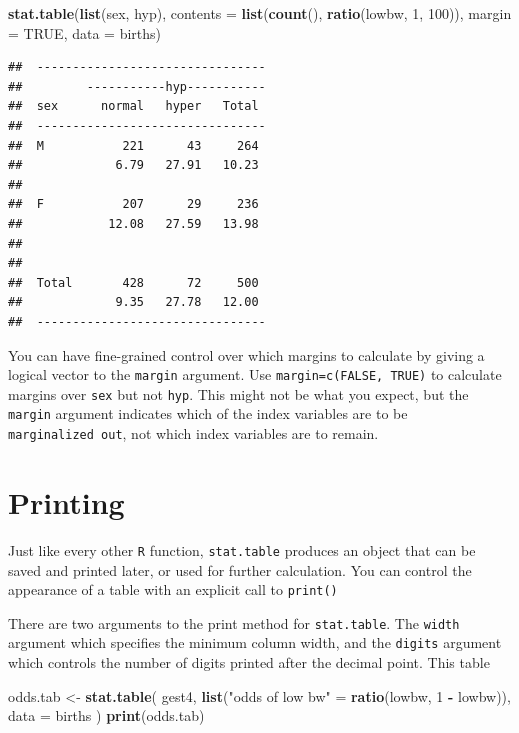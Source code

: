 \documentclass[
]{book}
\newenvironment{Shaded}{\begin{snugshade}}{\end{snugshade}}
\newcommand{\AttributeTok}[1]{\textcolor[rgb]{0.13,0.29,0.53}{#1}}
\newcommand{\ConstantTok}[1]{\textcolor[rgb]{0.56,0.35,0.01}{#1}}
\newcommand{\DecValTok}[1]{\textcolor[rgb]{0.00,0.00,0.81}{#1}}
\newcommand{\FunctionTok}[1]{\textcolor[rgb]{0.13,0.29,0.53}{\textbf{#1}}}
\newcommand{\NormalTok}[1]{#1}
\newcommand{\OtherTok}[1]{\textcolor[rgb]{0.56,0.35,0.01}{#1}}
\newcommand{\SpecialCharTok}[1]{\textcolor[rgb]{0.81,0.36,0.00}{\textbf{#1}}}
\newcommand{\StringTok}[1]{\textcolor[rgb]{0.31,0.60,0.02}{#1}}
\theoremstyle{definition}
\theoremstyle{definition}
\theoremstyle{definition}
\theoremstyle{definition}
\theoremstyle{remark}
\begin{document}
\begin{Shaded}
\begin{Highlighting}[]
\FunctionTok{stat.table}\NormalTok{(}\FunctionTok{list}\NormalTok{(sex, hyp), }\AttributeTok{contents =} \FunctionTok{list}\NormalTok{(}\FunctionTok{count}\NormalTok{(), }\FunctionTok{ratio}\NormalTok{(lowbw, }\DecValTok{1}\NormalTok{, }\DecValTok{100}\NormalTok{)), }\AttributeTok{margin =} \ConstantTok{TRUE}\NormalTok{, }\AttributeTok{data =}\NormalTok{ births)}
\end{Highlighting}
\end{Shaded}

\begin{verbatim}
##  -------------------------------- 
##         -----------hyp----------- 
##  sex      normal   hyper   Total  
##  -------------------------------- 
##  M           221      43     264  
##             6.79   27.91   10.23  
##                                   
##  F           207      29     236  
##            12.08   27.59   13.98  
##                                   
##                                   
##  Total       428      72     500  
##             9.35   27.78   12.00  
##  --------------------------------
\end{verbatim}

You can have fine-grained control over which margins to calculate by
giving a logical vector to the \texttt{margin} argument. Use \texttt{margin=c(FALSE,\ TRUE)}
to calculate margins over \texttt{sex} but not
\texttt{hyp}. This might not be what you expect, but the \texttt{margin}
argument indicates which of the index variables are to be \texttt{marginalized\ out},
not which index variables are to remain.

\section{Printing}\label{printing}

Just like every other \texttt{R} function, \texttt{stat.table} produces
an object that can be saved and printed later, or used for further
calculation. You can control the appearance of a table with an explicit
call to \texttt{print()}

There are two arguments to the print method for \texttt{stat.table}. The
\texttt{width} argument which specifies the minimum column width, and the
\texttt{digits} argument which controls
the number of digits printed after the decimal point. This table

\begin{Shaded}
\begin{Highlighting}[]
\NormalTok{odds.tab }\OtherTok{\textless{}{-}} 
  \FunctionTok{stat.table}\NormalTok{(}
\NormalTok{    gest4, }
    \FunctionTok{list}\NormalTok{(}\StringTok{"odds of low bw"} \OtherTok{=} \FunctionTok{ratio}\NormalTok{(lowbw, }\DecValTok{1} \SpecialCharTok{{-}}\NormalTok{ lowbw)),}
    \AttributeTok{data =}\NormalTok{ births}
\NormalTok{)}
\FunctionTok{print}\NormalTok{(odds.tab)}
\end{Highlighting}
\end{Shaded}
\end{document}
